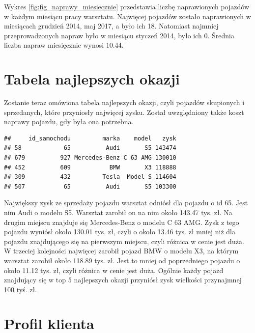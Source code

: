 \documentclass{article}\usepackage[]{graphicx}\usepackage[]{xcolor}
\makeatletter
\newenvironment{kframe}{%
 \def\at@end@of@kframe{}%
 \ifinner\ifhmode%
  \def\at@end@of@kframe{\end{minipage}}%
  \begin{minipage}{\columnwidth}%
 \fi\fi%
 \def\FrameCommand##1{\hskip\@totalleftmargin \hskip-\fboxsep
 \colorbox{shadecolor}{##1}\hskip-\fboxsep
     \hskip-\linewidth \hskip-\@totalleftmargin \hskip\columnwidth}%
 \MakeFramed {\advance\hsize-\width
   \@totalleftmargin\z@ \linewidth\hsize
   \@setminipage}}%
 {\par\unskip\endMakeFramed%
 \at@end@of@kframe}
\newenvironment{knitrout}{}{} %
\makeatother
\begin{document}
Wykres \ref{fig:fig_naprawy_miesiecznie} przedstawia liczbę naprawionych pojazdów w każdym miesiącu pracy warsztatu. Najwięcej pojazdów zostało naprawionych w miesiącach 
grudzień 2014, maj 2017,
a było ich 18. Natomiast najmniej przeprowadzonych napraw było w miesiącu
styczeń 2014,
było ich 0. Średnia liczba napraw miesięcznie wynosi 
10.44. 

\section{Tabela najlepszych okazji}

Zostanie teraz omówiona tabela najlepszych okazji, czyli pojazdów skupionych i sprzedanych, które przyniosły najwięcej zysku. Został uwzględniony także koszt naprawy pojazdu, gdy była ona potrzebna.





\begin{knitrout}
\color{fgcolor}\begin{kframe}
\begin{verbatim}
##     id_samochodu         marka    model   zysk
## 58            65          Audi       S5 143474
## 679          927 Mercedes-Benz C 63 AMG 130010
## 452          609           BMW       X3 118888
## 309          432         Tesla  Model S 114604
## 507           65          Audi       S5 103300
\end{verbatim}
\end{kframe}
\end{knitrout}

Największy zysk ze sprzedaży pojazdu warsztat odniósł dla pojazdu o id 65. Jest nim Audi o modelu S5. Warsztat zarobił on na nim około 143.47 tys. zł. 
Na drugim miejscu znajduje się Mercedes-Benz o modelu C 63 AMG. Zysk z tego pojazdu wyniósł około 130.01 tys. zł, czyli o około 13.46 tys. zł mniej niż dla pojazdu znajdującego się na pierwszym miejscu, czyli różnica w cenie jest duża.
W trzeciej kolejności najwięcej zarobił pojazd BMW o modelu X3, na którym warsztat zarobił około 118.89 tys. zł. Jest to mniej od poprzedniego pojazdu o około 11.12 tys. zł, czyli różnica w cenie jest duża. 
Ogólnie każdy pojazd znajdujący się w top 5 najlepszych okazji przyniósł zysk wielkości przynajmnej 100 tyś. zł.

\section{Profil klienta}
\end{document}
